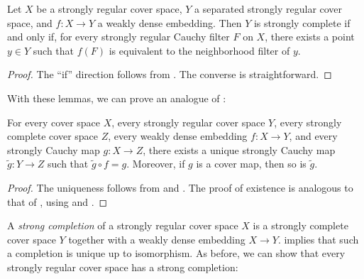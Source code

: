 \documentclass[reqno]{amsart}
\theoremstyle{definition}
\theoremstyle{remark}
\numberwithin{figure}{section}
\begin{document}
\begin{lem}
Let $X$ be a strongly regular cover space, $Y$ a separated strongly regular cover space, and $f : X \to Y$ a weakly dense embedding.  
Then $Y$ is strongly complete if and only if, for every strongly regular Cauchy filter $F$ on $X$, there exists a point $y \in Y$ such that $f(F)$ is equivalent to the neighborhood filter of $y$.
\end{lem}
\begin{proof}
The ``if'' direction follows from .
The converse is straightforward.
\end{proof}

With these lemmas, we can prove an analogue of :

\begin{thm}
For every cover space $X$, every strongly regular cover space $Y$, every strongly complete cover space $Z$, every weakly dense embedding $f : X \to Y$, and every strongly Cauchy map $g : X \to Z$,
there exists a unique strongly Cauchy map $\widetilde{g} : Y \to Z$ such that $\widetilde{g} \circ f = g$.
Moreover, if $g$ is a cover map, then so is $\widetilde{g}$.
\end{thm}
\begin{proof}
The uniqueness follows from  and .
The proof of existence is analogous to that of , using  and .
\end{proof}

A \emph{strong completion} of a strongly regular cover space $X$ is a strongly complete cover space $Y$ together with a weakly dense embedding $X \to Y$.
 implies that such a completion is unique up to isomorphism.
As before, we can show that every strongly regular cover space has a strong completion:
\end{document}
